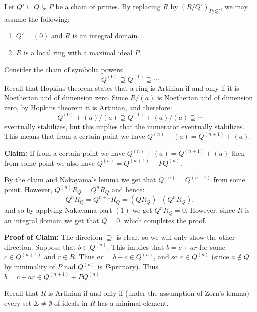 \documentclass[11pt,a4paper]{article}
\begin{document}
\begin{proofof}{}
  Let $Q' \subseteq Q \subsetneq P$ be a chain of primes.
  By replacing $R$ by $(R/Q')_{P/Q'}$,
  we may assume the following:
  \begin{enumerate}
    \item[(1)] $Q' = (0)$ and $R$ is an integral domain.
    \item[(2)] $R$ is a local ring with a maximal ideal $P$.
  \end{enumerate}
  Consider the chain of symbolic powers:
  \[
    Q^{(0)} \supseteq Q^{(1)} \supseteq \cdots
  \]
  Recall that Hopkins theorem states that a ring is Artinian if and only if
  it is Noetherian and of dimension zero.
  Since $R/(a)$ is Noetherian and of dimension zero, by Hopkins theorem
  it is Artinian, and therefore:
  \[
    Q^{(0)} + (a)/(a) \supseteq Q^{(1)} + (a)/(a) \supseteq \cdots
  \]
  eventually stabilizes, but this implies that the numerator eventually
  stabilizes.
  This means that from a certain point we have
  $Q^{(n)} + (a) = Q^{(n+1)} + (a)$.

  \noindent
  \textbf{Claim:} If from a certain point we have
  $Q^{(n)} + (a) = Q^{(n+1)} + (a)$ then from some point we also have
  $Q^{(n)} = Q^{(n+1)} + P Q^{(n)}$.

  \noindent
  By the claim and Nakayama's lemma we get that $Q^{(n)} = Q^{(n+1)}$ from some
  point.
  However, $Q^{(n)} R_Q = Q^n R_Q$ and hence:
  \[
    Q^n R_Q = Q^{n+1} R_Q = (Q R_Q) \cdot (Q^n R_Q),
  \]
  and so by applying Nakayama part $(1)$ we get $Q^n R_Q = 0$.
  However, since $R$ is an integral domain we get that $Q = 0$,
  which completes the proof.

  \noindent
  \textbf{Proof of Claim:}
  The direction $\supseteq$ is clear, so we will only show the other direction.
  Suppose that $b \in Q^{(n)}$.
  This implies that $b = c + ar$ for some $c \in Q^{(n+1)}$ and $r \in R$.
  Thus $ar = b - c \in Q^{(n)}$, and so $r \in Q^{(n)}$
  (since $a \notin Q$ by minimality of $P$ nad $Q^{(n)}$ is $P$-primary).
  Thus $b = c + ar \in Q^{(n+1)} + P Q^{(n)}$.
\end{proofof}

\begin{remark}
  \label{rmk:artinian-equiv}
  Recall that $R$ is Artinian if and only if (under the assumption of Zorn's
  lemma) every set $\Sigma \neq \emptyset$ of ideals in $R$ has
  a minimal element.
\end{remark}
\end{document}
